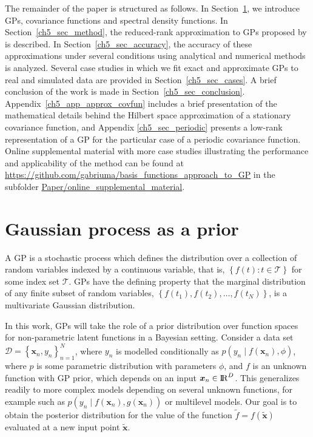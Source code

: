 \documentclass[onecolumn,a4paper,11pt]{article}
\begin{document}
The remainder of the paper is structured as follows. In Section~\ref{ch4_gp}, we introduce GPs, covariance functions and spectral density functions. In Section~\ref{ch5_sec_method}, the reduced-rank approximation to GPs proposed by \citet{solin2018hilbert} is described. In Section~\ref{ch5_sec_accuracy}, the accuracy of these approximations under several conditions using analytical and numerical methods is analyzed. Several case studies in which we fit exact and approximate GPs to real and simulated data are provided in Section~\ref{ch5_sec_cases}. A brief conclusion of the work is made in Section~\ref{ch5_sec_conclusion}. Appendix~\ref{ch5_app_approx_covfun} includes a brief presentation of the mathematical details behind the Hilbert space approximation of a stationary covariance function, and Appendix \ref{ch5_sec_periodic} presents a low-rank representation of a GP for the particular case of a periodic covariance function. Online supplemental material with more case studies illustrating the performance and applicability of the method can be found at \url{https://github.com/gabriuma/basis_functions_approach_to_GP} in the subfolder \url{Paper/online_supplemental_material}.


\section{Gaussian process as a prior}\label{ch4_gp}

A GP is a stochastic process which defines the distribution over a collection of random variables indexed by a continuous variable, that is, $\left\lbrace f(t): t \in \mathcal{T}\right\rbrace$ for some index set $\mathcal{T}$. GPs have the defining property that the marginal distribution of any finite subset of random variables, $\left\lbrace f(t_1), f(t_2), \hdots, f(t_N) \right\rbrace$, is a multivariate Gaussian distribution.

In this work, GPs will take the role of a prior distribution over function spaces for non-parametric latent functions in a Bayesian setting. Consider a data set $\mathcal{D} = \left\lbrace \bm{x}_n, y_n \right\rbrace_{n=1}^N$, where $y_n$ is modelled conditionally as $p(y_n \mid f(\bm{x}_n),\phi)$, where $p$ is some parametric distribution with parameters  $\phi$, and $f$ is an unknown function with GP prior, which depends on an input $\bm{x}_n\in {\rm I\!R}^D$. This generalizes readily to more complex models depending on several unknown functions, for example such as $p(y_n \mid f(\bm{x}_n),g(\bm{x}_n))$ or multilevel models. Our goal is to obtain the posterior distribution for the value of the function $\tilde{f}=f(\tilde{\bm{x}})$  evaluated at a new input point $\tilde{\bm{x}}$.
\end{document}
